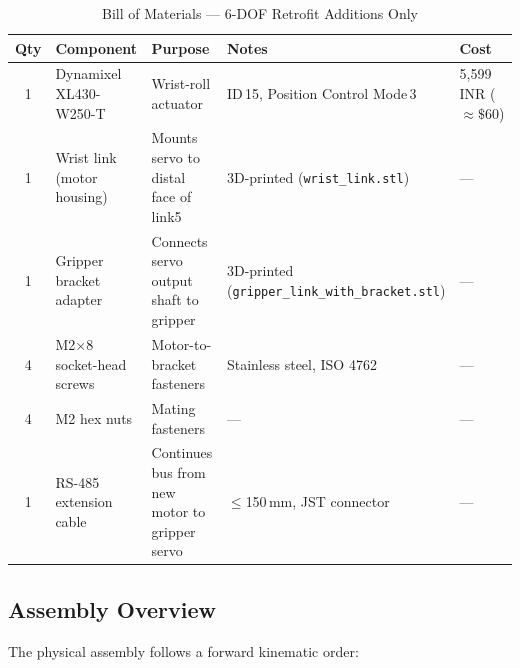 \documentclass[conference]{IEEEtran}
\begin{document}
		\begin{table}[t]
			\centering
			\caption{Bill of Materials --- 6-DOF Retrofit Additions Only}
			\label{tab:bom}
			\renewcommand{\arraystretch}{2.5}
			\small
			\begin{tabular}{cllll}
				\toprule
				\textbf{Qty} & \textbf{Component} & \textbf{Purpose} & \textbf{Notes} & \textbf{Cost} \\
				\midrule
				1 & Dynamixel XL430-W250-T 
				& Wrist-roll actuator 
				& ID\,15, Position Control Mode\,3 
				& 5{,}599 INR ($\approx \$60$)\\
				
				1 & Wrist link (motor housing) 
				& \makecell[l]{Mounts servo to distal\\face of link5} 
				& 3D-printed (\texttt{wrist\_link.stl}) 
				& --- \\
				
				1 & Gripper bracket adapter 
				& \makecell[l]{Connects servo output\\shaft to gripper} 
				& \makecell[l]{3D-printed\\(\texttt{gripper\_link\_with\_bracket.stl})} 
				& --- \\
				
				4 & M2$\times$8 socket-head screws 
				& Motor-to-bracket fasteners 
				& Stainless steel, ISO 4762 
				& --- \\
				
				4 & M2 hex nuts 
				& Mating fasteners 
				& --- 
				& --- \\
				
				1 & RS-485 extension cable 
				& \makecell[l]{Continues bus from new\\motor to gripper servo} 
				& $\leq$150\,mm, JST connector 
				& --- \\
				\bottomrule
			\end{tabular}
		\end{table}
		
		\subsection{Assembly Overview}
		
		The physical assembly follows a forward kinematic order:
		
\end{document}
